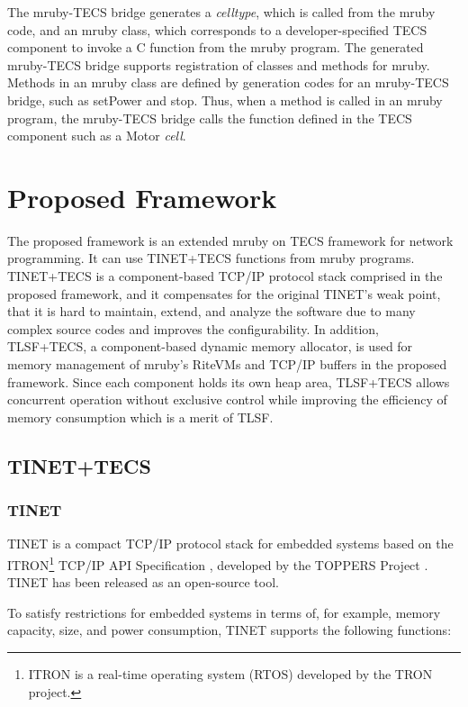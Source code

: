 \documentclass[JIP]{ipsj_v2/UTF8/ipsj}
\begin{document}
The mruby-TECS bridge generates a {\it celltype}, which is called from the mruby code, and an mruby class, which corresponds to a developer-specified TECS component to invoke a C function from the mruby program.
The generated mruby-TECS bridge supports registration of classes and methods for mruby.
Methods in an mruby class are defined by generation codes for an mruby-TECS bridge, such as setPower and stop.
Thus, when a method is called in an mruby program, the mruby-TECS bridge calls the function defined in the TECS component such as a Motor {\it cell}.

\section{Proposed Framework}
\label{sec:Proposed Framework}

The proposed framework is an extended mruby on TECS framework for network programming.
It can use TINET+TECS functions from mruby programs.
TINET+TECS is a component-based TCP/IP protocol stack comprised in the proposed framework, and it compensates for the original TINET's weak point, that it is hard to maintain, extend, and analyze the software due to many complex source codes and improves the configurability.
In addition, TLSF+TECS, a component-based dynamic memory allocator, is used for memory management of mruby's RiteVMs and TCP/IP buffers in the proposed framework.
Since each component holds its own heap area, TLSF+TECS allows concurrent operation without exclusive control while improving the efficiency of memory consumption which is a merit of TLSF.


\subsection{TINET+TECS}
\label{sec:TINET+TECS}

\subsubsection{TINET}

TINET is a compact TCP/IP protocol stack for embedded systems based on the ITRON\footnote{ITRON is a real-time operating system (RTOS) developed by the TRON project.} TCP/IP API Specification \cite{url:ITRON_TCP/IP_API_Spec}, developed by the TOPPERS Project \cite{url:TOPPERS}.
TINET has been released as an open-source tool.

To satisfy restrictions for embedded systems in terms of, for example, memory capacity, size, and power consumption, TINET supports the following functions:
\end{document}
